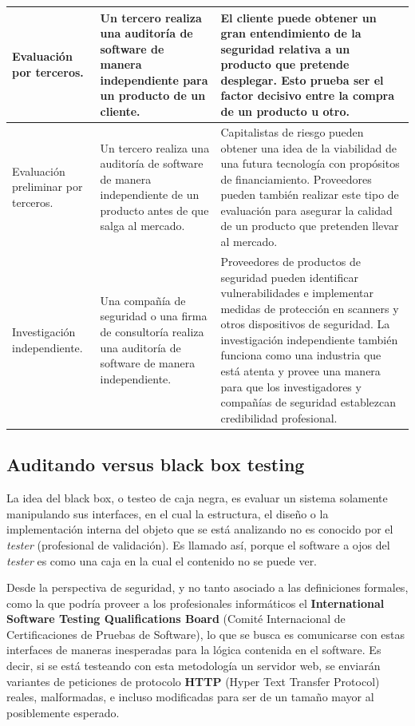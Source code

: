 \begin{tabular}{|p{4.3cm}|p{4.3cm}|p{4.3cm}|}
    \hline
    Evaluación por terceros. & Un tercero realiza una auditoría de software de manera independiente para un producto de un cliente. & El cliente puede obtener un gran entendimiento de la seguridad relativa a un producto que pretende desplegar. Esto prueba ser el factor decisivo entre la compra de un producto u otro. \\
    \hline
    Evaluación preliminar por terceros. & Un tercero realiza una auditoría de software de manera independiente de un producto antes de que salga al mercado. & Capitalistas de riesgo pueden obtener una idea de la viabilidad de una futura tecnología con propósitos de financiamiento. Proveedores pueden también realizar este tipo de evaluación para asegurar la calidad de un producto que pretenden llevar al mercado. \\
    \hline
    Investigación independiente. & Una compañía de seguridad o una firma de consultoría realiza una auditoría de software de manera independiente. & Proveedores de productos de seguridad pueden identificar vulnerabilidades e implementar medidas de protección en scanners y otros dispositivos de seguridad. La investigación independiente también funciona como una industria que está atenta y provee una manera para que los investigadores y compañías de seguridad establezcan credibilidad profesional. \\
    \hline
\end{tabular}

\subsection{Auditando versus black box testing}
La idea del black box, o testeo de caja negra, es evaluar un sistema solamente manipulando sus interfaces, en el cual la estructura, el diseño o la implementación interna del objeto que se está analizando no es conocido por el \textit{tester} (profesional de validación). Es llamado así, porque el software a ojos del \textit{tester} es como una caja en la cual el contenido no se puede ver.

Desde la perspectiva de seguridad, y no tanto asociado a las definiciones formales, como la que podría proveer a los profesionales informáticos el \textbf{International Software Testing Qualifications Board} (Comité Internacional de Certificaciones de Pruebas de Software), lo que se busca es comunicarse con estas interfaces de maneras inesperadas para la lógica contenida en el software. Es decir, si se está testeando con esta metodología un servidor web, se enviarán variantes de peticiones de protocolo \textbf{HTTP} (Hyper Text Transfer Protocol) reales, malformadas, e incluso modificadas para ser de un tamaño mayor al posiblemente esperado.

